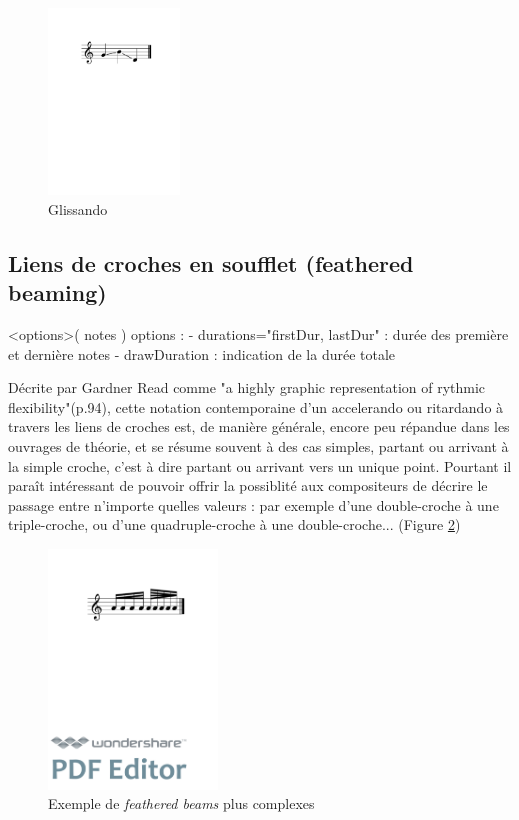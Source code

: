 \documentclass{article}
\newenvironment{gmncode}	{\vspace{-2mm}\small\verbatim}{\endverbatim\vspace{-2mm}}
\begin{document}
\begin{figure}[h]
\centering

\begin{gmncode}
[ \glissando( g b d ) ]
\end{gmncode}

\includegraphics[width=35mm]{img/glissando1.pdf}
\caption{Glissando}
\label{fig:glissandoSimple}
\end{figure}




\subsection{Liens de croches en soufflet (feathered beaming)}
\bigskip

\begin{gmncode}
\fBeam<options>( notes )
  options : 
    - durations="firstDur, lastDur" : 
      durée des première et dernière notes
    - drawDuration : 
      indication de la durée totale

\end{gmncode}

Décrite par Gardner Read \cite{read1969music} comme "a highly graphic representation of rythmic flexibility"(p.94), cette notation contemporaine d'un accelerando ou ritardando à travers les liens de croches est, de manière générale, encore peu répandue dans les ouvrages de théorie, et se résume souvent à des cas simples, partant ou arrivant à la simple croche, c'est à dire partant ou arrivant vers un unique point. Pourtant il paraît intéressant de pouvoir offrir la possiblité aux compositeurs de décrire le passage entre n'importe quelles valeurs : par exemple d'une double-croche à une triple-croche, ou d'une quadruple-croche à une double-croche... (Figure \ref{fig:fbeamcomplex})

\begin{figure}[h]
\centering
\includegraphics[width=45mm]{img/fbeamcomplex.pdf}
\caption{Exemple de \emph{feathered beams} plus complexes}
\label{fig:fbeamcomplex}
\end{figure}
\end{document}
